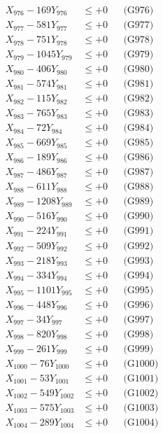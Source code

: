 \documentclass[a4paper,10pt]{article}
\begin{document}
{\begin{align}
X_{976} - 169Y_{976} &\leq +0 && \text{(G976)} \\
X_{977} - 581Y_{977} &\leq +0 && \text{(G977)} \\
X_{978} - 751Y_{978} &\leq +0 && \text{(G978)} \\
X_{979} - 1045Y_{979} &\leq +0 && \text{(G979)} \\
X_{980} - 406Y_{980} &\leq +0 && \text{(G980)} \\
\allowbreak
X_{981} - 574Y_{981} &\leq +0 && \text{(G981)} \\
X_{982} - 115Y_{982} &\leq +0 && \text{(G982)} \\
X_{983} - 765Y_{983} &\leq +0 && \text{(G983)} \\
X_{984} - 72Y_{984} &\leq +0 && \text{(G984)} \\
X_{985} - 669Y_{985} &\leq +0 && \text{(G985)} \\
X_{986} - 189Y_{986} &\leq +0 && \text{(G986)} \\
X_{987} - 486Y_{987} &\leq +0 && \text{(G987)} \\
X_{988} - 611Y_{988} &\leq +0 && \text{(G988)} \\
X_{989} - 1208Y_{989} &\leq +0 && \text{(G989)} \\
X_{990} - 516Y_{990} &\leq +0 && \text{(G990)} \\
\allowbreak
X_{991} - 224Y_{991} &\leq +0 && \text{(G991)} \\
X_{992} - 509Y_{992} &\leq +0 && \text{(G992)} \\
X_{993} - 218Y_{993} &\leq +0 && \text{(G993)} \\
X_{994} - 334Y_{994} &\leq +0 && \text{(G994)} \\
X_{995} - 1101Y_{995} &\leq +0 && \text{(G995)} \\
X_{996} - 448Y_{996} &\leq +0 && \text{(G996)} \\
X_{997} - 34Y_{997} &\leq +0 && \text{(G997)} \\
X_{998} - 820Y_{998} &\leq +0 && \text{(G998)} \\
X_{999} - 261Y_{999} &\leq +0 && \text{(G999)} \\
X_{1000} - 76Y_{1000} &\leq +0 && \text{(G1000)} \\
\allowbreak
X_{1001} - 53Y_{1001} &\leq +0 && \text{(G1001)} \\
X_{1002} - 549Y_{1002} &\leq +0 && \text{(G1002)} \\
X_{1003} - 575Y_{1003} &\leq +0 && \text{(G1003)} \\
X_{1004} - 289Y_{1004} &\leq +0 && \text{(G1004)} \\

\end{align}}
\end{document}
